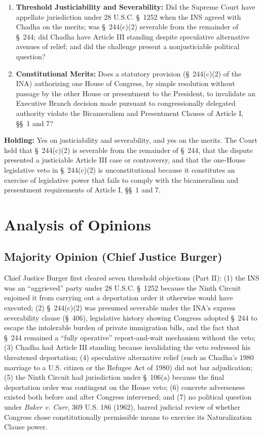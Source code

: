 \documentclass[12pt]{article}
\begin{document}
\begin{enumerate}
  \item \textbf{Threshold Justiciability and Severability:} Did the Supreme Court have appellate jurisdiction under 28 U.S.C. \S~1252 when the INS agreed with Chadha on the merits; was \S~244(c)(2) severable from the remainder of \S~244; did Chadha have Article III standing despite speculative alternative avenues of relief; and did the challenge present a nonjusticiable political question?
  \item \textbf{Constitutional Merits:} Does a statutory provision (\S~244(c)(2) of the INA) authorizing one House of Congress, by simple resolution without passage by the other House or presentment to the President, to invalidate an Executive Branch decision made pursuant to congressionally delegated authority violate the Bicameralism and Presentment Clauses of Article I, \S\S~1 and 7?
\end{enumerate}

\textbf{Holding:} Yes on justiciability and severability, and yes on the merits. The Court held that \S~244(c)(2) is severable from the remainder of \S~244, that the dispute presented a justiciable Article III case or controversy, and that the one-House legislative veto in \S~244(c)(2) is unconstitutional because it constitutes an exercise of legislative power that fails to comply with the bicameralism and presentment requirements of Article I, \S\S~1 and 7.

\section{Analysis of Opinions}
\subsection{Majority Opinion (Chief Justice Burger)}

Chief Justice Burger first cleared seven threshold objections (Part II): (1) the INS was an ``aggrieved'' party under 28 U.S.C. \S~1252 because the Ninth Circuit enjoined it from carrying out a deportation order it otherwise would have executed; (2) \S~244(c)(2) was presumed severable under the INA's express severability clause (\S~406), legislative history showing Congress adopted \S~244 to escape the intolerable burden of private immigration bills, and the fact that \S~244 remained a ``fully operative'' report-and-wait mechanism without the veto; (3) Chadha had Article III standing because invalidating the veto redressed his threatened deportation; (4) speculative alternative relief (such as Chadha's 1980 marriage to a U.S. citizen or the Refugee Act of 1980) did not bar adjudication; (5) the Ninth Circuit had jurisdiction under \S~106(a) because the final deportation order was contingent on the House veto; (6) concrete adverseness existed both before and after Congress intervened; and (7) no political question under \textit{Baker v. Carr}, 369 U.S. 186 (1962), barred judicial review of whether Congress chose constitutionally permissible means to exercise its Naturalization Clause power.
\end{document}

